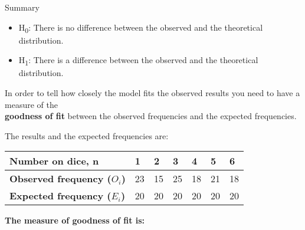 \documentclass[fleqn]{article}
\begin{document}
\begin{mybox2}[colbacktitle=WildStrawberry]{Summary}
    \begin{itemize}
        \bfseries
        \item H\textsubscript{0}: There is no difference between the observed and the theoretical distribution.
        \item H\textsubscript{1}: There is a difference between the observed and the theoretical distribution.
    \end{itemize}
    
    In order to tell how closely the model fits the observed results you need to have a measure of the \\\textbf{goodness of fit} between the observed frequencies and the expected frequencies.
    
    The results and the expected frequencies are:
    
    \begin{center}\vspace{-2mm}
    \begin{minipage}[t]{0.8\linewidth}
        \begin{tabularx}{\textwidth}{|X|*6{P{11mm}|}}
            \hline
            \textbf{Number on dice, n}          & 1  & 2  & 3  & 4  & 5  & 6        \\\hline
            \textbf{Observed frequency ($O_i$)} & 23 & 15 & 25 & 18 & 21 & 18       \\\hline
            \textbf{Expected frequency ($E_i$)} & 20 & 20 & 20 & 20 & 20 & 20       \\\hline
        \end{tabularx}
        \vspace{4mm}
    \end{minipage}
    \end{center}
    
    
    \textbf{The measure of goodness of fit is:}
    
\end{mybox2}
\end{document}
